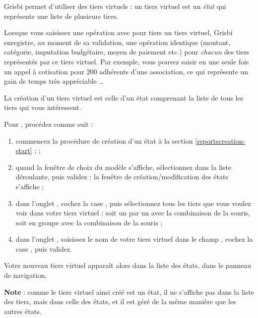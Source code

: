 Grisbi permet d'utiliser des tiers virtuels : un tiers virtuel est un \emph{état} qui représente une liste de plusieurs tiers.

Lorsque vous saisissez une opération avec pour tiers un tiers virtuel, Grisbi enregistre, au moment de sa validation, une opération identique (montant, catégorie, imputation budgétaire, moyen de paiement etc.) pour \emph{chacun} des tiers représentés par ce tiers virtuel. Par exemple, vous pouvez saisir en une seule fois un appel à cotisation pour 200 adhérents d'une association, ce qui représente un gain de temps très appréciable \ldots

La création d'un tiers virtuel est celle d'un état comprenant la liste de tous les tiers qui vous intéressent.

\ifIllustration
\fi

Pour , procédez comme suit :

\begin{enumerate}
	\item  commencez la procédure de création d'un état à la section \vref{reportscreation-start} ;  ; 
	\item quand la fenêtre de choix du modèle s'affiche, sélectionnez  dans la liste déroulante, puis validez : la fenêtre de création/modification des états s'affiche ;
	\item dans l'onglet , cochez la case , puis sélectionnez tous les tiers que vous voulez voir dans votre tiers virtuel : soit un par un avec la combinaison   de la souris, soit en groupe avec la combinaison   de la souris ;  
	\item dans l'onglet , saisissez le nom de votre tiers virtuel dans le champ  , cochez la case , puis validez.
\end{enumerate}

Votre nouveau tiers virtuel apparaît alors dans la liste des états, dans le panneau de navigation.

\textbf{Note} : comme le tiers virtuel ainsi créé est un état, il ne s'affiche pas dans la liste des tiers, mais dans celle des états, et il est géré de la même manière que les autres états. 

